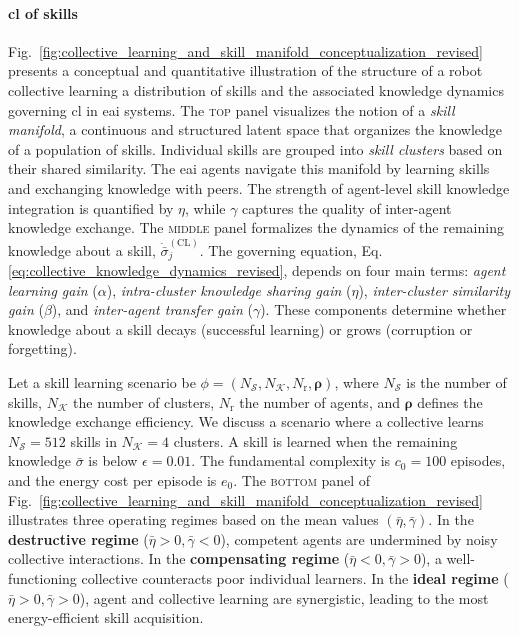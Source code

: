 \documentclass[12pt]{article}
\begin{document}
\paragraph*{\Acl{cl} of skills}
Fig.~\ref{fig:collective_learning_and_skill_manifold_conceptualization_revised} presents a conceptual and quantitative illustration of the structure of a robot collective learning a distribution of skills and the associated knowledge dynamics governing \ac{cl} in \ac{eai} systems. The \textsc{top} panel visualizes the notion of a \textit{skill manifold}, a continuous and structured latent space that organizes the knowledge of a population of skills. Individual skills are grouped into \textit{skill clusters} based on their shared similarity. The \ac{eai} agents navigate this manifold by learning skills and exchanging knowledge with peers. The strength of agent-level skill knowledge integration is quantified by $\eta$, while $\gamma$ captures the quality of inter-agent knowledge exchange. The \textsc{middle} panel formalizes the dynamics of the remaining knowledge about a skill, $\dot{\bar{\sigma}}^{(\mathrm{CL})}_j$. The governing equation, Eq.\eqref{eq:collective_knowledge_dynamics_revised}, depends on four main terms: \emph{agent learning gain} ($\alpha$), \emph{intra-cluster knowledge sharing gain} ($\eta$), \emph{inter-cluster similarity gain} ($\beta$), and \emph{inter-agent transfer gain} ($\gamma$). These components determine whether knowledge about a skill decays (successful learning) or grows (corruption or forgetting).

Let a skill learning scenario be $\phi = (N_\mathcal{S}, N_\mathcal{K}, N_\mathrm{r}, \bm{\rho})$, where $N_\mathcal{S}$ is the number of skills, $N_\mathcal{K}$ the number of clusters, $N_\mathrm{r}$ the number of agents, and $\bm{\rho}$ defines the knowledge exchange efficiency. We discuss a scenario where a collective learns $N_\mathcal{S}=512$ skills in $N_\mathcal{K}=4$ clusters. A skill is learned when the remaining knowledge $\bar{\sigma}$ is below $\epsilon = 0.01$. The fundamental complexity is $c_0 = 100$ episodes, and the energy cost per episode is $e_0$. The \textsc{bottom} panel of Fig.~\ref{fig:collective_learning_and_skill_manifold_conceptualization_revised} illustrates three operating regimes based on the mean values $(\bar{\eta}, \bar{\gamma})$. In the \textbf{destructive regime} ($\bar{\eta} > 0, \bar{\gamma} < 0$), competent agents are undermined by noisy collective interactions. In the \textbf{compensating regime} ($\bar{\eta} < 0, \bar{\gamma} > 0$), a well-functioning collective counteracts poor individual learners. In the \textbf{ideal regime} ($\bar{\eta} > 0, \bar{\gamma} > 0$), agent and collective learning are synergistic, leading to the most energy-efficient skill acquisition.
\end{document}
